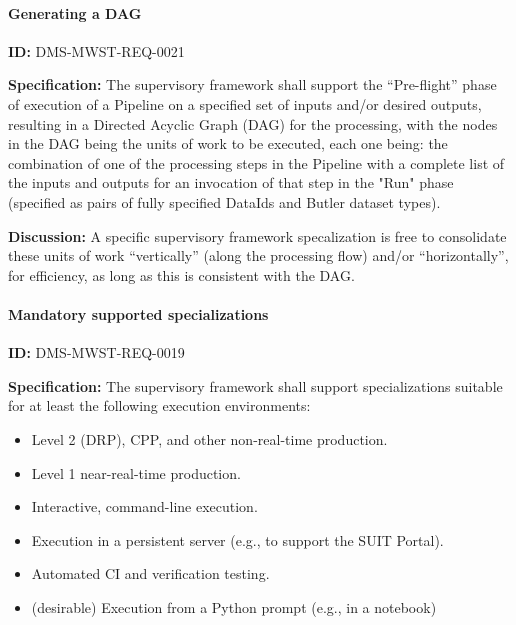 \documentclass[SE,toc,lsstdraft]{lsstdoc}
\begin{document}
\paragraph{Generating a DAG}\hfill  %

\label{DMS-MWST-REQ-0021}
\textbf{ID:} DMS-MWST-REQ-0021

\textbf{Specification:}
The supervisory framework shall support the “Pre-flight” phase of execution of a Pipeline on a specified set of inputs and/or desired outputs, resulting in a Directed Acyclic Graph (DAG) for the processing, with the nodes in the DAG being the units of work to be executed, each one being: the combination of one of the processing steps in the Pipeline with a complete list of the inputs and outputs for an invocation of that step in the "Run" phase (specified as pairs of fully specified DataIds and Butler dataset types).

\textbf{Discussion:}
A specific supervisory framework specalization is free to consolidate these units of work “vertically” (along the processing flow) and/or “horizontally”, for efficiency, as long as this is consistent with the DAG.

\paragraph{Mandatory supported specializations}\hfill  %

\label{DMS-MWST-REQ-0019}
\textbf{ID:} DMS-MWST-REQ-0019

\textbf{Specification:}
The supervisory framework shall support specializations suitable for at least the following execution environments:

    \begin{itemize}
\item
Level 2 (DRP), CPP, and other non-real-time production.

\item
Level 1 near-real-time production.

\item
Interactive, command-line execution.

\item
Execution in a persistent server (e.g., to support the SUIT Portal).

\item
Automated CI and verification testing.

\item
(desirable) Execution from a Python prompt (e.g., in a notebook)

    \end{itemize}
\end{document}
